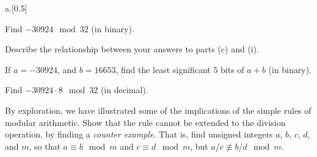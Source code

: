 \begin{question}{a.}[0.5]
    \item[1]
    Find $-30924\mod{32}$ (in binary).
    \begin{Questions}
    \vfill
    \end{Questions}
    \item[1]
    Describe the relationship between your answers to parts (c) and (i).
    \begin{Questions}
    \vfill\vfill
    \end{Questions}
    \item[0.5] If $a = -30924$, and $b= 16653$, find the least significant 5 bits of $a+b$ (in binary).
    \begin{Questions}
    \vfill
    \end{Questions}
    \item[0.5] Find $-30924 \cdot 8\mod{32}$ (in decimal).
    \begin{Questions}
    \vfill\eject
    \end{Questions}
    \item[2]
    By exploration, we have illustrated some of the implications of the simple rules of modular arithmetic. Show that the rule cannot be extended to the division operation, by finding a {\em counter example}. That is, find unsigned integers $a$, $b$, $c$, $d$, and $m$, so that $a\equiv b\mod{m}$ and $c\equiv d\mod{m}$, but $a/c\not\equiv b/d\mod{m}$.
    \begin{Questions}
    \vfill
    \end{Questions}
    
\end{question}
\vfill\eject
